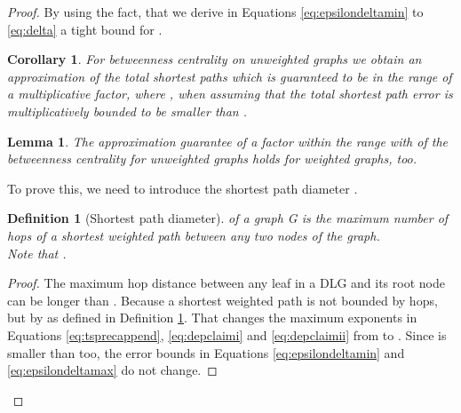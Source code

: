 \documentclass[11pt]{article}
\newtheorem{lemma}[theorem]{Lemma}
\newtheorem{corollary}[theorem]{Corollary}
\newtheorem{definition}[theorem]{Definition}
\newcommand{\todo}[1]{{\begin{small}\sffamily \color{red}TODO:  #1 \end{small}}}
\newcommand{\todoI}[1]{}\newcommand{\blueI}[1]{}
\newcommand{\blue}[1]{{ \color{blue} #1 }}
\newif\iffull
\begin{document}
\begin{proof}
By using the fact, that  we derive in Equations \eqref{eq:epsilondeltamin} to \eqref{eq:delta} a tight bound for .







\begin{corollary}
For betweenness centrality on unweighted graphs we obtain an approximation of the total shortest paths which is guaranteed to be in the range of a  multiplicative factor, where , when assuming that the total shortest path error is multiplicatively bounded to be smaller than .
\label{cor:tsperrunw}
\end{corollary}
\todoI{
\begin{proof}
The Error Bound \eqref{eq:delta} holds for the dependencies calculated in Algorithm \ref{alg:BC_g}, Line \ref{line:dep1bc} and \ref{line:depbc}. By adding multiple dependencies, in Line \ref{line:sumsbc} of the same algorithm, the error bounds do not change. Neither do they change in Algorithm\iffull~\ref{alg:BC_setup_controlling}\fi~\textsc{BCsetup}, Line \ref{line:scalebc}, by scaling up the dependencies of  on  to the approximated betweenness centrality . This is true, as in sumations and when scaling equations, the multiplicative error can simply \todo{be factored out -- what does this mean?}. \blue{ and , it holds , d.h.  aendert sich nicht}
\label{lemma:tsperrw}
\end{proof}
}


\begin{lemma}
The approximation guarantee of a factor within the range  with  of the betweenness centrality for unweighted graphs holds for weighted graphs, too.
\label{lemma:shortesp:weighted}
\end{lemma}
To prove this, we need to introduce the shortest path diameter .
\begin{definition}[Shortest path diameter]
 of a graph G is the maximum number of hops of a shortest weighted path between any two nodes of the graph.\\
Note that .
\label{def:diamsp}
\end{definition}

\begin{proof}
The maximum hop distance between any leaf  in a DLG and its root node  can be longer than . Because a shortest weighted path is not bounded by  hops, but by  as defined in Definition \ref{def:diamsp}. That changes the maximum exponents in Equations \eqref{eq:tsprecappend}, \eqref{eq:depclaimi} and \eqref{eq:depclaimii} from  to . Since  is smaller than  too, the error bounds in Equations \eqref{eq:epsilondeltamin} and \eqref{eq:epsilondeltamax} do not change.
\end{proof} 








\end{proof}
\end{document}
